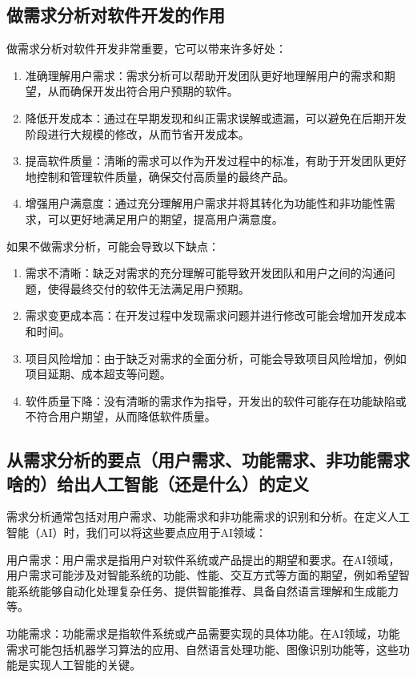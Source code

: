 \documentclass[11pt, a4paper, oneside]{ctexbook}
\begin{document}
\subsection*{做需求分析对软件开发的作用}
做需求分析对软件开发非常重要，它可以带来许多好处：
\begin{enumerate}
    \item 准确理解用户需求：需求分析可以帮助开发团队更好地理解用户的需求和期望，从而确保开发出符合用户预期的软件。
    \item 降低开发成本：通过在早期发现和纠正需求误解或遗漏，可以避免在后期开发阶段进行大规模的修改，从而节省开发成本。
    \item 提高软件质量：清晰的需求可以作为开发过程中的标准，有助于开发团队更好地控制和管理软件质量，确保交付高质量的最终产品。
    \item 增强用户满意度：通过充分理解用户需求并将其转化为功能性和非功能性需求，可以更好地满足用户的期望，提高用户满意度。
\end{enumerate}

如果不做需求分析，可能会导致以下缺点：
\begin{enumerate}
    \item 需求不清晰：缺乏对需求的充分理解可能导致开发团队和用户之间的沟通问题，使得最终交付的软件无法满足用户预期。
    \item 需求变更成本高：在开发过程中发现需求问题并进行修改可能会增加开发成本和时间。
    \item 项目风险增加：由于缺乏对需求的全面分析，可能会导致项目风险增加，例如项目延期、成本超支等问题。
    \item 软件质量下降：没有清晰的需求作为指导，开发出的软件可能存在功能缺陷或不符合用户期望，从而降低软件质量。
\end{enumerate}

\subsection*{从需求分析的要点（用户需求、功能需求、非功能需求啥的）给出人工智能（还是什么）的定义}

需求分析通常包括对用户需求、功能需求和非功能需求的识别和分析。在定义人工智能（AI）时，我们可以将这些要点应用于AI领域：

用户需求：用户需求是指用户对软件系统或产品提出的期望和要求。在AI领域，用户需求可能涉及对智能系统的功能、性能、交互方式等方面的期望，例如希望智能系统能够自动化处理复杂任务、提供智能推荐、具备自然语言理解和生成能力等。

功能需求：功能需求是指软件系统或产品需要实现的具体功能。在AI领域，功能需求可能包括机器学习算法的应用、自然语言处理功能、图像识别功能等，这些功能是实现人工智能的关键。
\end{document}
